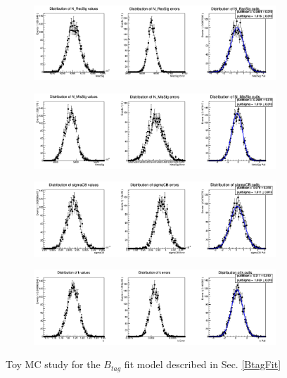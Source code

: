 \newpage

\begin{figure}[h!]
  \begin{subfigure}{15cm}
    \centering\includegraphics[width=14cm]{A1-Appendix/figs/NrecSigBtag_mcstudy.png}
  \end{subfigure}
  \begin{subfigure}{15cm}
    \centering\includegraphics[width=14cm]{A1-Appendix/figs/nMisSig_mcstudy.png}
  \end{subfigure}

  \begin{subfigure}{15cm}
    \centering\includegraphics[width=14cm]{A1-Appendix/figs/sigmaCB_mcstudy.png}
  \end{subfigure}
  \begin{subfigure}{15cm}
    \centering\includegraphics[width=14cm]{A1-Appendix/figs/k_mcstudy.png}
  \end{subfigure}
  \caption{Toy MC study for the $B_{tag}$ fit model described in Sec. \ref{BtagFit}}
\end{figure}

